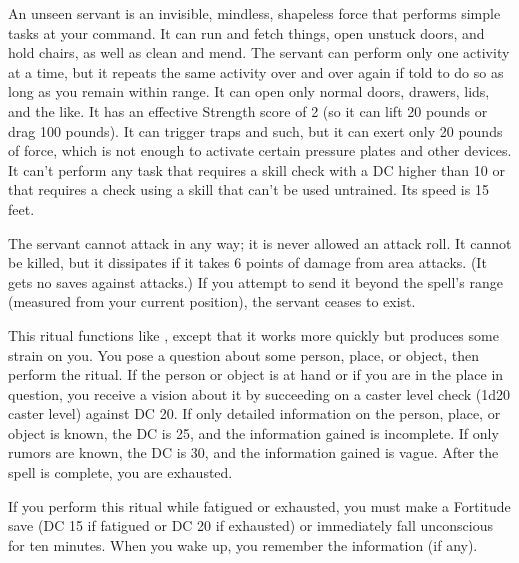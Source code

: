 \spellrng{\rngmed}
\begin{spelleffect}
An unseen servant is an invisible, mindless, shapeless force that performs simple tasks at your command. It can run and fetch things, open unstuck doors, and hold chairs, as well as clean and mend. The servant can perform only one activity at a time, but it repeats the same activity over and over again if told to do so as long as you remain within range. It can open only normal doors, drawers, lids, and the like. It has an effective Strength score of 2 (so it can lift 20 pounds or drag 100 pounds). It can trigger traps and such, but it can exert only 20 pounds of force, which is not enough to activate certain pressure plates and other devices. It can't perform any task that requires a skill check with a DC higher than 10 or that requires a check using a skill that can't be used untrained. Its speed is 15 feet.
\par The servant cannot attack in any way; it is never allowed an attack roll. It cannot be killed, but it dissipates if it takes 6 points of damage from area attacks. (It gets no saves against attacks.) If you attempt to send it beyond the spell's range (measured from your current position), the servant ceases to exist.
\end{spelleffect}

\begin{spelleffect}
This ritual functions like , except that it works more quickly but produces some strain on you. You pose a question about some person, place, or object, then perform the ritual. If the person or object is at hand or if you are in the place in question, you receive a vision about it by succeeding on a caster level check (1d20 \add caster level) against DC 20. If only detailed information on the person, place, or object is known, the DC is 25, and the information gained is incomplete. If only rumors are known, the DC is 30, and the information gained is vague. After the spell is complete, you are exhausted.
\par If you perform this ritual while fatigued or exhausted, you must make a Fortitude save (DC 15 if fatigued or DC 20 if exhausted) or immediately fall unconscious for ten minutes. When you wake up, you remember the information (if any).
\end{spelleffect}

